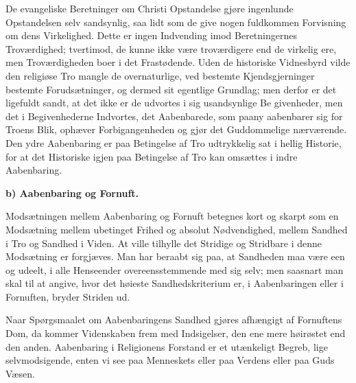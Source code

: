 \documentclass[12pt]{book}
\newcommand{\runhead}[1]{%
  \medskip\begin{center}{\bfseries #1}\end{center}\medskip}
\begin{document}
De evangeliske Beretninger om Christi Opstandelse gjøre ingenlunde
Opstandelsen selv sandsynlig, saa lidt som de give nogen fuldkommen
Forvisning om dens Virkelighed. Dette er ingen Indvending imod
Beretningernes Troværdighed; tvertimod, de kunne ikke være
troværdigere end de virkelig ere, men Troværdigheden boer i det
Frastødende. Uden de historiske Vidnesbyrd vilde den religiøse Tro
mangle de overnaturlige, ved bestemte Kjendsgjerninger bestemte
Forudsætninger, og dermed sit egentlige Grundlag; men derfor er det
ligefuldt sandt, at det ikke er de udvortes i sig usandsynlige Be\-
givenheder, men det i Begivenhederne Indvortes, det Aabenbarede, som
paany aabenbarer sig for Troens Blik, ophæver Forbigangenheden og
gjør det Guddommelige nærværende. Den ydre Aabenbaring er paa
Betingelse af Tro udtrykkelig sat i hellig Historie, for at det
Historiske igjen paa Betingelse af Tro kan omsættes i indre
Aabenbaring.

\runhead{b) Aabenbaring og Fornuft.}

Modsætningen mellem Aabenbaring og Fornuft betegnes kort og skarpt
som en Modsætning mellem ubetinget Frihed og absolut Nødvendighed,
mellem Sandhed i Tro og Sandhed i Viden. At ville tilhylle det
Stridige og Stridbare i denne Modsætning er forgjæves. Man har
beraabt sig paa, at Sandheden maa være een og udeelt, i alle
Henseender overeensstemmende med sig selv; men saasnart man skal til
at angive, hvor det høieste Sandhedskriterium er, i Aabenbaringen
eller i Fornuften, bryder Striden ud.

Naar Spørgsmaalet om Aabenbaringens Sandhed gjøres afhængigt af
Fornuftens Dom, da kommer Videnskaben frem med Indsigelser, den ene
mere høirøstet end den anden. Aabenbaring i Religionens Forstand er
et utænkeligt Begreb, lige selvmodsigende, enten vi see paa
Menneskets eller paa Verdens eller paa Guds Væsen.
\end{document}
